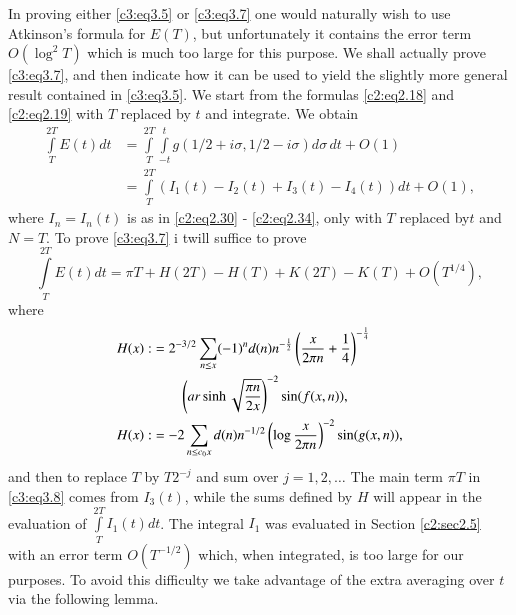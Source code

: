 In proving either \eqref{c3:eq3.5} or \eqref{c3:eq3.7} one would
naturally wish to use Atkinson's formula for $E(T)$, but unfortunately
it contains the error term $O(\log^2 T)$ which is much too large for
this purpose. We shall actually prove \eqref{c3:eq3.7}, and then
indicate how it can be used to yield the slightly more general result
contained in \eqref{c3:eq3.5}. We start from the formulas
\eqref{c2:eq2.18} and \eqref{c2:eq2.19} with $T$ replaced by $t$ and
integrate. We obtain
\begin{align*}
  \int\limits_T^{2T} E(t) dt & = \int\limits_{T}^{2T}
  \int\limits_{-t}^t g(1/2 + i \sigma, 1/2- i \sigma) d \sigma \, dt +
  O(1)\\
  & = \int\limits_T^{2T} (I_1 (t) - I_2 (t) + I_3 (t) - I_4 (t)) dt + O(1),
\end{align*}
where $I_n = I_n(t)$ is as in \eqref{c2:eq2.30} - \eqref{c2:eq2.34},
only with $T$ replaced by\pageoriginale $t$ and $N=T$. To prove
\eqref{c3:eq3.7} i twill suffice to prove
\begin{equation}
  \int\limits_T^{2T} E(t) dt = \pi T + H(2T) - H(T) + K(2T) - K(T) +
  O(T^{1/4}),\label{c3:eq3.8}
\end{equation}
where
\begin{align}
  H(x) : & = 2^{-3/2} \sum_{n \leq x} (-1)^n d(n) n^{-\frac{1}{2}}
  \left(\frac{x}{2 \pi n} + \frac{1}{4} \right)^{-\frac{1}{4}}\label{c3:eq3.9}\\ 
  &\qquad\left(ar \sinh
  \sqrt{\frac{\pi n}{2 x}}\right)^{-2} \sin (f(x, n)),\notag\\
  H(x) : & = -2 \sum_{n \leq c_0 x} d(n) n^{-1/2} \left(\log
  \frac{x}{2 \pi n} \right)^{-2} \sin (g(x, n)),\label{c3:eq3.10}
\end{align}
and then to replace $T$ by $T 2^{-j}$ and sum over $j= 1, 2,
\ldots$ The main term $\pi T$ in \eqref{c3:eq3.8} comes from $I_3
(t)$, while the sums defined by $H$ will appear in the evaluation of
$\displaystyle{\int\limits_{T}^{2T} I_1 (t) dt}$. The integral $I_1$
was evaluated in Section \ref{c2:sec2.5} with an error term
$O(T^{-1/2})$ which, when integrated, is too large for our
purposes. To avoid this difficulty we take advantage of the extra
averaging over $t$ via the following lemma.

